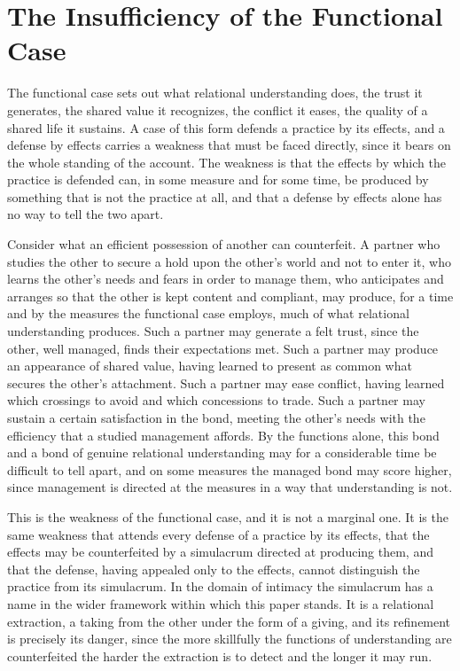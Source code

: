 \section{The Insufficiency of the Functional Case}
\label{p27:sec:functionlimit}

\noindent
The functional case sets out what relational understanding does, the trust it generates, the shared value it recognizes, the conflict it eases, the quality of a shared life it sustains. A case of this form defends a practice by its effects, and a defense by effects carries a weakness that must be faced directly, since it bears on the whole standing of the account. The weakness is that the effects by which the practice is defended can, in some measure and for some time, be produced by something that is not the practice at all, and that a defense by effects alone has no way to tell the two apart.

Consider what an efficient possession of another can counterfeit. A partner who studies the other to secure a hold upon the other's world and not to enter it, who learns the other's needs and fears in order to manage them, who anticipates and arranges so that the other is kept content and compliant, may produce, for a time and by the measures the functional case employs, much of what relational understanding produces. Such a partner may generate a felt trust, since the other, well managed, finds their expectations met. Such a partner may produce an appearance of shared value, having learned to present as common what secures the other's attachment. Such a partner may ease conflict, having learned which crossings to avoid and which concessions to trade. Such a partner may sustain a certain satisfaction in the bond, meeting the other's needs with the efficiency that a studied management affords. By the functions alone, this bond and a bond of genuine relational understanding may for a considerable time be difficult to tell apart, and on some measures the managed bond may score higher, since management is directed at the measures in a way that understanding is not.

This is the weakness of the functional case, and it is not a marginal one. It is the same weakness that attends every defense of a practice by its effects, that the effects may be counterfeited by a simulacrum directed at producing them, and that the defense, having appealed only to the effects, cannot distinguish the practice from its simulacrum. In the domain of intimacy the simulacrum has a name in the wider framework within which this paper stands. It is a relational extraction, a taking from the other under the form of a giving, and its refinement is precisely its danger, since the more skillfully the functions of understanding are counterfeited the harder the extraction is to detect and the longer it may run.


